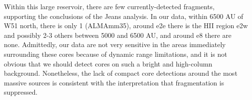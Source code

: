 \documentclass{emulateapj}
\begin{document}




Within this large reservoir, there are few currently-detected fragments,
supporting the conclusions of the Jeans analysis.
In our data, within 6500 AU of W51 north, there is only 1 (ALMAmm35), around
e2e there is the HII region e2w and possibly 2-3 others between 5000 and 6500
AU, and around e8 there are none.  Admittedly, our data are not very sensitive
in the areas immediately surrounding these cores because of dynamic
range limitations, and it is not obvious that we should detect cores on such
a bright and high-column background.  Nonetheless, the lack of compact core
detections around the most massive sources is consistent with the interpretation
that fragmentation is suppressed.

\end{document}
